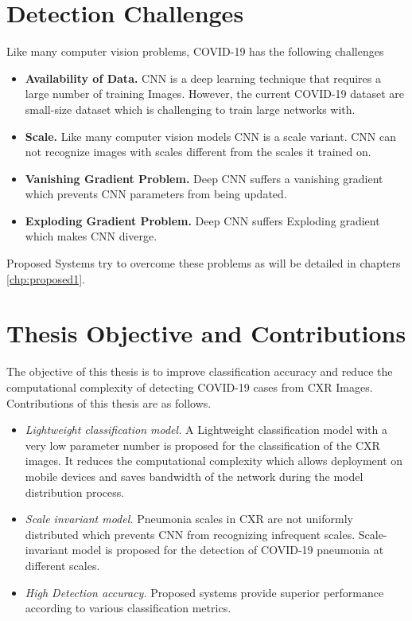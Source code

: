 \section{Detection Challenges}
Like many computer vision problems, COVID-19 has the following challenges
\begin{itemize}

\item \textbf{Availability of Data.} CNN is a deep learning technique that requires a large number of training Images. However, the current COVID-19 dataset are small-size dataset which is challenging to train large networks with. 
\item \textbf{Scale.} Like many computer vision models CNN is a scale variant. CNN can not recognize images with scales different from the scales it trained on.
\item \textbf{Vanishing Gradient Problem.} Deep CNN suffers a vanishing gradient which prevents CNN parameters from being updated.
\item \textbf{Exploding Gradient Problem.} Deep CNN suffers Exploding gradient which makes CNN diverge.
\end{itemize}
Proposed Systems try to overcome these problems as will be detailed in chapters \ref{chp:proposed1}.

\section{Thesis Objective and Contributions}
The objective of this thesis is to improve classification accuracy and reduce the computational complexity of detecting COVID-19 cases from CXR Images. Contributions of this thesis are as follows.
\begin{itemize}
    \item \textit{Lightweight classification model.} A Lightweight classification model with a very low parameter number is proposed for the classification of the CXR images. It reduces the computational complexity which allows deployment on mobile devices and saves bandwidth of the network during the model distribution process. 
    \item \textit{Scale invariant model.}  Pneumonia scales in CXR are not uniformly distributed which prevents CNN from recognizing infrequent scales. Scale-invariant model is proposed for the detection of COVID-19 pneumonia at different scales.
    \item \textit{High Detection accuracy.} Proposed systems provide superior performance according to various classification metrics.
\end{itemize}


